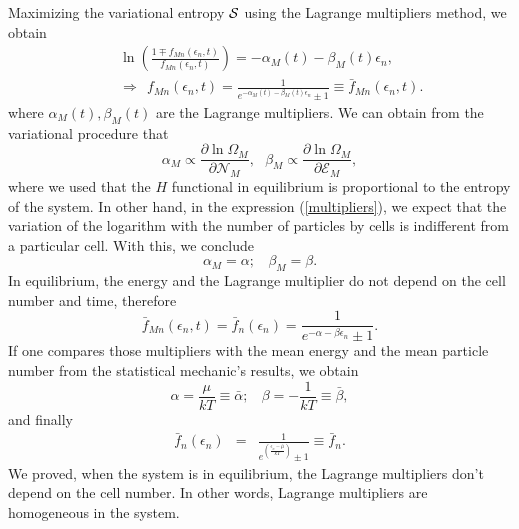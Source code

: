 Maximizing the variational entropy $\mathcal{S}$ using the Lagrange multipliers method,
we obtain
%
\begin{eqnarray}
&&\ln \left(\frac{1\mp f_{Mn}(\epsilon_{n},t)}{f_{Mn}(\epsilon_{n},t)} \right)=-\alpha_M(t)-\beta_M(t) \epsilon_{n}, \label{relation}\\ &&\Rightarrow \ \ f_{Mn}(\epsilon_{n},t)=\frac{1}{e^{-\alpha_M(t)-\beta_M(t) \epsilon_{n}}\pm 1} \equiv \bar{f}_{Mn}(\epsilon_{n},t) \label{distributionequilibrium}.
\end{eqnarray}
%
where $\alpha_M(t), \beta_M(t)$ are the Lagrange multipliers. We can obtain
from the variational procedure that
%
\begin{equation}
    \alpha_M\propto \frac{\partial \ln \Omega_M}{\partial \mathcal{N}_M}, \ \ \ \beta_M\propto \frac{\partial \ln \Omega_M}{\partial \mathcal{E}_M},\label{multipliers}
\end{equation}
%
where we used that the $H$ functional in equilibrium is proportional to the
entropy of the system.
In other hand, in the expression (\ref{multipliers}), we expect that the
variation of the logarithm with the number of particles by cells is indifferent
from a particular cell. With this, we conclude 
%
\begin{equation}
    \alpha_M=\alpha; \ \ \ \ \beta_M=\beta.
\end{equation}
%
In equilibrium, the energy and the Lagrange multiplier do not depend on the
cell number and time, therefore
%
\begin{equation}
    \bar f_{Mn}(\epsilon_{n},t)=\bar f_n(\epsilon_{n}) =\frac{1}{e^{-\alpha-\beta \epsilon_n}\pm 1}.
\end{equation}
%
If one compares those multipliers with the mean energy and the mean particle
number from the statistical mechanic's results, we obtain
%
\begin{equation}
    \alpha=\frac{\mu}{kT}\equiv \bar{\alpha}; \ \ \ \ \beta=-\frac{1}{kT}\equiv \bar{\beta},
\end{equation}
%
and finally
%
\begin{eqnarray}
    \bar{f}_{n}(\epsilon_{n})&=&\frac{1}{e^{(\frac{{\epsilon_n}-\bar{\mu}}{kT})}\pm 1}\equiv \bar{f}_{n}.
\end{eqnarray}
%
We proved, when the system is in equilibrium, the Lagrange multipliers don't
depend on the cell number. In other words, Lagrange multipliers are homogeneous
in the system.

